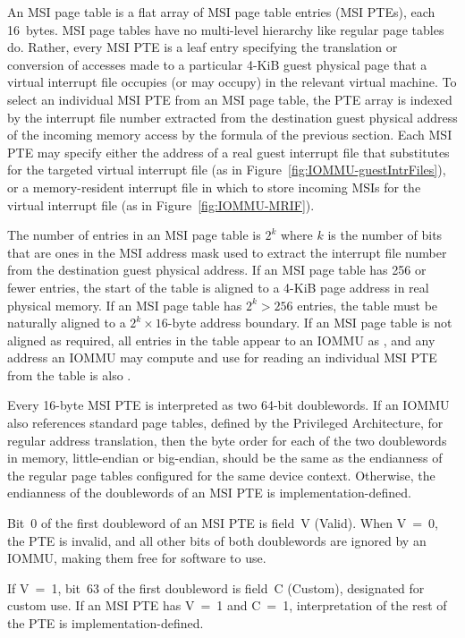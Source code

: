 An MSI page table is a flat array of MSI page table entries (MSI PTEs),
each 16~bytes.
MSI page tables have no multi-level hierarchy like regular {\RISCV}
page tables do.
Rather, every MSI PTE is a leaf entry specifying the translation or
conversion of accesses made to a particular \mbox{4-KiB} guest physical
page that a virtual interrupt file occupies (or may occupy) in the
relevant virtual machine.
To select an individual MSI PTE from an MSI page table, the PTE array
is indexed by the interrupt file number extracted from the destination
guest physical address of the incoming memory access by the formula of the
previous section.
Each MSI PTE may specify either the address of a real guest interrupt
file that substitutes for the targeted virtual interrupt file (as in
Figure~\ref{fig:IOMMU-guestIntrFiles}), or a memory-resident interrupt
file in which to store incoming MSIs for the virtual interrupt file
(as in Figure~\ref{fig:IOMMU-MRIF}).

The number of entries in an MSI page table is
$\mbox{2}^{k}$ where $k$ is the number of bits that are
ones in the MSI address mask used to extract the interrupt file number
from the destination guest physical address.
If an MSI page table has 256 or fewer entries, the start of the table
is aligned to a \mbox{4-KiB} page address in real physical
memory.
If an MSI page table has ${\mbox{2}^{k} > \mbox{256}}$
entries, the table must be naturally aligned to a
$\mbox{2}^{k}\times \mbox{16-byte}$ address boundary.
If an MSI page table is not aligned as required, all entries in the
table appear to an \mbox{IOMMU} as {\unspecified}, and any address an
\mbox{IOMMU} may compute and use for reading an individual MSI PTE from the
table is also {\unspecified}.

Every \mbox{16-byte} MSI PTE is interpreted as two \mbox{64-bit}
doublewords.
If an \mbox{IOMMU} also references standard {\RISCV} page tables, defined by
the {\RISCV} Privileged Architecture, for regular address translation,
then the byte order for each of the two doublewords in memory,
little-endian or big-endian, should be the same as the endianness
of the regular {\RISCV} page tables configured for the same device
context.
Otherwise, the endianness of the doublewords of an MSI PTE is
implementation-defined.

Bit~0 of the first doubleword of an MSI PTE is field~V (Valid).
When V~=~0, the PTE is invalid, and all other bits of both doublewords
are ignored by an \mbox{IOMMU}, making them free for software to use.

If V~=~1, bit~63 of the first doubleword is field~C (Custom),
designated for custom use.
If an MSI PTE has V~=~1 and C~=~1, interpretation of the rest of the
PTE is implementation-defined.

